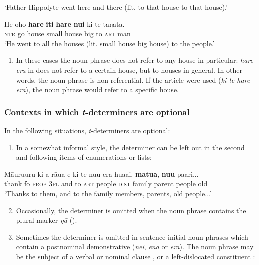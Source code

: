 \glt 
‘Father Hippolyte went here and there (lit. to that house to that house).’ \textstyleExampleref{[R231.282]} 
\z

\ea\label{ex:5.21}
\gll He oho \textbf{hare} \textbf{{\ꞌ}iti} \textbf{hare} \textbf{nui} ki te taŋata. \\
\textsc{ntr} go house small house big to \textsc{art} man \\

\glt
‘He went to all the houses (lit. small house big house) to the people.’ \textstyleExampleref{[R368.056]} 
\z

\begin{enumerate}
\item[]
In these cases the noun phrase does not refer to any house in particular: \textit{hare era} in  does not refer to a certain house, but to houses in general. In other words, the noun phrase is non-referential. If the article were used (\textit{ki te hare era}), the noun phrase would refer to a specific house.
\end{enumerate}

\subsubsection{Contexts in which \textit{t}{}-determiners are optional}\label{sec:5.3.2.3}

In the following situations, \textit{t}{}-determiners are optional:

\begin{enumerate}
\setcounter{enumi}{0}
\item
In a somewhat informal style, the determiner can be left out in the second and following items of enumerations or lists:
\end{enumerate}

\ea\label{ex:5.22}
\gll Māuruuru ki a rāua {\ꞌ}e ki te nu{\ꞌ}u era hua{\ꞌ}ai, \textbf{matu{\ꞌ}a}, \textbf{nu{\ꞌ}u} pa{\ꞌ}ari...\\
thank fo \textsc{prop} \textsc{3pl} and to \textsc{art} people \textsc{dist} family parent people old\\

\glt 
‘Thanks to them, and to the family members, parents, old people...’ \textstyleExampleref{[R202.004]} 
\z

\begin{enumerate}
\setcounter{enumi}{1}
\item
Occasionally, the determiner is omitted when the noun phrase contains the plural marker \textit{ŋā} ().

\item
Sometimes the determiner is omitted in sentence-initial noun phrases which contain a postnominal demonstrative (\textit{nei}, \textit{ena} or \textit{era}). The noun phrase may be the subject of a verbal  or nominal clause , or a left-dislocated constituent :
\end{enumerate}

